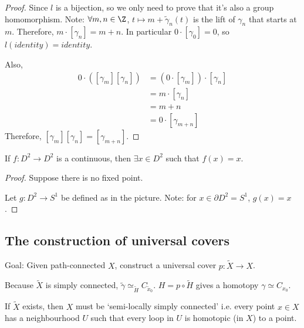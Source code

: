 \documentclass{article}
\numberwithin{nthm}{subsection}
\begin{document}
\begin{proof}
    Since $l$ is a bijection, so we only need to prove that it's also a group homomorphism. Note: $\forall m, n \in \Z$, $t \mapsto m + \widetilde{\gamma}_n(t)$ is the lift of $\gamma_n$ that starts at $m$. Therefore, $m \cdot [\gamma_n] = m+n$.
    In particular $0 \cdot [\gamma_0] = 0$, so $l(identity) = identity$.

    Also,
    \begin{align*}
        0 \cdot ([\gamma_m] [\gamma_n]) &= (0 \cdot [\gamma_m]) \cdot [\gamma_n] \\
                                        &= m \cdot [\gamma_n] \\
                                        &= m + n \\
                                        &= 0 \cdot [\gamma_{m+n}]
    \end{align*}
    Therefore, $[\gamma_m][\gamma_n] = [\gamma_{m+n}]$.
\end{proof}

\begin{cor}
    If $f: D^2 \to D^2$ is a continuous, then $\exists x \in D^2$ such that $f(x) = x$.
\end{cor}

\begin{proof}
    Suppose there is no fixed point.

    Let $g: D^2 \to S^1$ be defined as in the picture. Note: for $x \in \partial D^2 = S^1$, $g(x) = x$.
\end{proof}

\subsection{The construction of universal covers}
Goal: Given path-connected $X$, construct a universal cover $p: \widetilde{X} \to X$.

Because $\widetilde{X}$ is simply connected, $\widetilde{\gamma} \simeq_{\widetilde{H}} C_{\widetilde{x}_0}$.
$H = p \circ \widetilde{H}$ gives a homotopy $\gamma \simeq C_{x_0}$.

\begin{remark}
    If $\widetilde{X}$ exists, then $X$ must be `semi-locally simply connected' i.e. every point $x \in X$ has a neighbourhood $U$ such that every loop in $U$ is homotopic (in $X$) to a point.
\end{remark}
\end{document}
